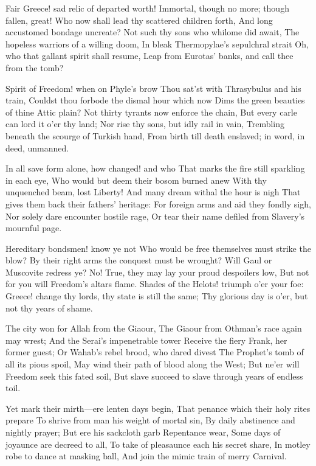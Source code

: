 \documentclass[10pt,twocolumn]{book}
\begin{document}
   Fair Greece! sad relic of departed worth!
   Immortal, though no more; though fallen, great!
   Who now shall lead thy scattered children forth,
   And long accustomed bondage uncreate?
   Not such thy sons who whilome did await,
   The hopeless warriors of a willing doom,
   In bleak Thermopylae's sepulchral strait\textemdash
   Oh, who that gallant spirit shall resume,
Leap from Eurotas' banks, and call thee from the tomb?


   Spirit of Freedom! when on Phyle's brow
   Thou sat'st with Thrasybulus and his train,
   Couldst thou forbode the dismal hour which now
   Dims the green beauties of thine Attic plain?
   Not thirty tyrants now enforce the chain,
   But every carle can lord it o'er thy land;
   Nor rise thy sons, but idly rail in vain,
   Trembling beneath the scourge of Turkish hand,
From birth till death enslaved; in word, in deed, unmanned.


   In all save form alone, how changed! and who
   That marks the fire still sparkling in each eye,
   Who would but deem their bosom burned anew
   With thy unquenched beam, lost Liberty!
   And many dream withal the hour is nigh
   That gives them back their fathers' heritage:
   For foreign arms and aid they fondly sigh,
   Nor solely dare encounter hostile rage,
Or tear their name defiled from Slavery's mournful page.


   Hereditary bondsmen! know ye not
   Who would be free themselves must strike the blow?
   By their right arms the conquest must be wrought?
   Will Gaul or Muscovite redress ye?  No!
   True, they may lay your proud despoilers low,
   But not for you will Freedom's altars flame.
   Shades of the Helots! triumph o'er your foe:
   Greece! change thy lords, thy state is still the same;
Thy glorious day is o'er, but not thy years of shame.


   The city won for Allah from the Giaour,
   The Giaour from Othman's race again may wrest;
   And the Serai's impenetrable tower
   Receive the fiery Frank, her former guest;
   Or Wahab's rebel brood, who dared divest
   The Prophet's tomb of all its pious spoil,
   May wind their path of blood along the West;
   But ne'er will Freedom seek this fated soil,
But slave succeed to slave through years of endless toil.

   Yet mark their mirth---ere lenten days begin,
   That penance which their holy rites prepare
   To shrive from man his weight of mortal sin,
   By daily abstinence and nightly prayer;
   But ere his sackcloth garb Repentance wear,
   Some days of joyaunce are decreed to all,
   To take of pleasaunce each his secret share,
   In motley robe to dance at masking ball,
And join the mimic train of merry Carnival.
\end{document}
